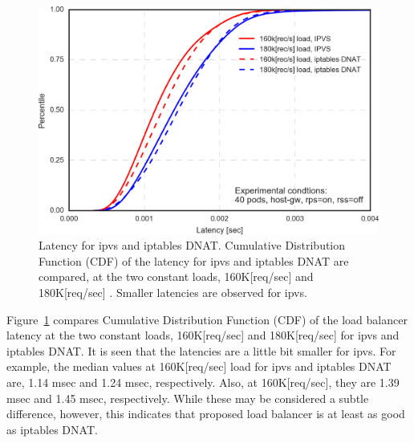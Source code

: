 \begin{figure}[h]
  \centering
  \includegraphics[width=0.75\columnwidth]{Figs/latency_cdf_rps_40pods}
  \par\bigskip
  \centering
  \begin{minipage}{0.9\columnwidth}
    \caption[Latency for ipvs and iptables DNAT]{
      Latency for ipvs and iptables DNAT.
      Cumulative Distribution Function (CDF) of the latency for ipvs and iptables DNAT are compared, at the two constant loads, 160K[req/sec] and 180K[req/sec] .
      Smaller latencies are observed for ipvs.
}
    \label{fig:latency_cdf_rps_40pods}
  \end{minipage}
\end{figure}

Figure~\ref{fig:latency_cdf_rps_40pods} compares Cumulative Distribution Function (CDF) of the load balancer latency at the two constant loads, 160K[req/sec] and 180K[req/sec] for ipvs and iptables DNAT.
It is seen that the latencies are a little bit smaller for ipvs.
For example, the median values at 160K[req/sec] load for ipvs and iptables DNAT are, 1.14 msec and 1.24 msec, respectively.
Also, at 160K[req/sec], they are 1.39 msec and 1.45 msec, respectively.
%
While these may be considered a subtle difference, however, this indicates that proposed load balancer is at least as good as iptables DNAT.



